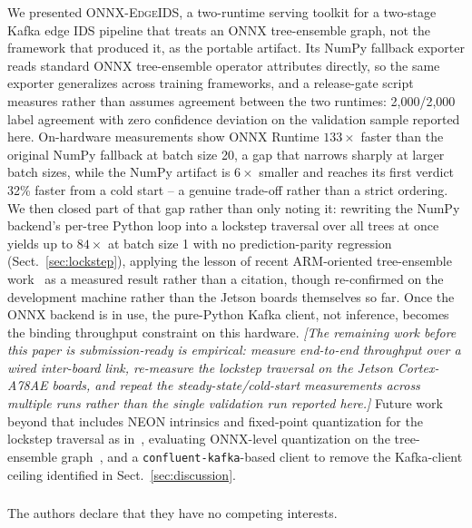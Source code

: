 \documentclass[runningheads]{llncs}
\newcommand{\ph}[1]{{\color{gray}\textit{[#1]}}}
\begin{document}
We presented \textsc{ONNX-EdgeIDS}, a two-runtime serving toolkit for a two-stage Kafka edge IDS pipeline that treats an ONNX tree-ensemble graph, not the framework that produced it, as the portable artifact. Its NumPy fallback exporter reads standard ONNX tree-ensemble operator attributes directly, so the same exporter generalizes across training frameworks, and a release-gate script measures rather than assumes agreement between the two runtimes: 2{,}000/2{,}000 label agreement with zero confidence deviation on the validation sample reported here. On-hardware measurements show ONNX Runtime $133\times$ faster than the original NumPy fallback at batch size 20, a gap that narrows sharply at larger batch sizes, while the NumPy artifact is $6\times$ smaller and reaches its first verdict 32\% faster from a cold start -- a genuine trade-off rather than a strict ordering. We then closed part of that gap rather than only noting it: rewriting the NumPy backend's per-tree Python loop into a lockstep traversal over all trees at once yields up to $84\times$ at batch size 1 with no prediction-parity regression (Sect.~\ref{sec:lockstep}), applying the lesson of recent ARM-oriented tree-ensemble work~\cite{koschel2023arm} as a measured result rather than a citation, though re-confirmed on the development machine rather than the Jetson boards themselves so far. Once the ONNX backend is in use, the pure-Python Kafka client, not inference, becomes the binding throughput constraint on this hardware. \ph{The remaining work before this paper is submission-ready is empirical: measure end-to-end throughput over a wired inter-board link, re-measure the lockstep traversal on the Jetson Cortex-A78AE boards, and repeat the steady-state/cold-start measurements across multiple runs rather than the single validation run reported here.} Future work beyond that includes NEON intrinsics and fixed-point quantization for the lockstep traversal as in~\cite{koschel2023arm}, evaluating ONNX-level quantization on the tree-ensemble graph~\cite{eren2026drdos}, and a \texttt{confluent-kafka}-based client to remove the Kafka-client ceiling identified in Sect.~\ref{sec:discussion}.

\begin{credits}
\subsubsection{\discintname}
The authors declare that they have no competing interests.
\end{credits}



\end{document}
